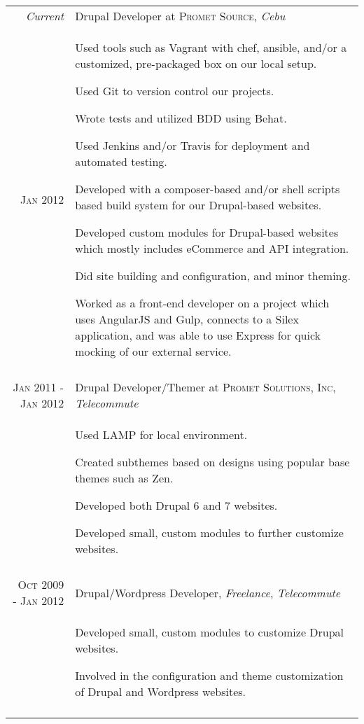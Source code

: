 \documentclass[a4paper,10pt]{article}
\begin{document}
\begin{tabular}{r|p{11cm}}
  \emph{Current}    & Drupal Developer at \textsc{Promet Source}, \emph{Cebu}\\
  \textsc{Jan 2012} &
  \begin{blacklist}
    \item Used tools such as Vagrant with chef, ansible, and/or a customized, pre-packaged box on our local setup.
    \item Used Git to version control our projects.
    \item Wrote tests and utilized BDD using Behat.
    \item Used Jenkins and/or Travis for deployment and automated testing.
    \item Developed with a composer-based and/or shell scripts based build system for our Drupal-based websites.
    \item Developed custom modules for Drupal-based websites which mostly includes eCommerce and API integration.
    \item Did site building and configuration, and minor theming.
    \item Worked as a front-end developer on a project which uses AngularJS and Gulp, connects to a Silex application, and was able to use Express for quick mocking of our external service.
  \end{blacklist}\\
  \multicolumn{2}{c}{}\\

  \textsc{Jan 2011 - Jan 2012} & Drupal Developer/Themer at \textsc{Promet Solutions, Inc}, \emph{Telecommute}\\ &
  \begin{blacklist}
    \item Used LAMP for local environment.
    \item Created subthemes based on designs using popular base themes such as Zen.
    \item Developed both Drupal 6 and 7 websites.
    \item Developed small, custom modules to further customize websites.
  \end{blacklist}\\
  \multicolumn{2}{c}{}\\

  \textsc{Oct 2009 - Jan 2012} & Drupal/Wordpress Developer, \emph{Freelance}, \emph{Telecommute}\\ &
  \begin{blacklist}
    \item Developed small, custom modules to customize Drupal websites.
    \item Involved in the configuration and theme customization of Drupal and Wordpress websites.
  \end{blacklist}\\
  \multicolumn{2}{c}{}\\


\end{tabular}
\end{document}
